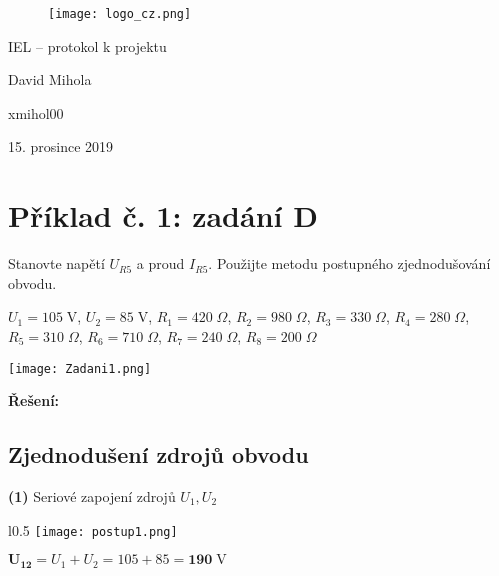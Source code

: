 \documentclass[a4paper,12pt]{article}
\begin{document}
\begin{figure}

\vspace{5em}
\begin{center}
\texttt{[image: logo\_cz.png]}
\end{center}
\end{figure}
\begin{center}
{\LARGE IEL -- protokol k projektu}\par
\vspace{1em}
{\large David Mihola\par xmihol00\par
\vspace{1em}
15. prosince 2019}
\end{center}

\newpage
\tableofcontents
\newpage
\section{Příklad č. 1: zadání D}
Stanovte napětí $U_{R5}$ a proud $I_{R5}$. Použijte metodu postupného zjednodušování obvodu.\par\vspace{1.5em}
$U_1=105\;\si{\volt}$, $U_2=85\;\si{\volt}$, $R_1=420\;\si{\Omega}$, $R_2=980\;\si{\Omega}$, $R_3=330\;\si{\Omega}$, $R_4=280\;\si{\Omega}$, $R_5=310\;\si{\Omega}$, $R_6=710\;\si{\Omega}$, $R_7=240\;\si{\Omega}$, $R_8=200\;\si{\Omega}$\vspace{1em}
\begin{center}
\texttt{[image: Zadani1.png]}
\end{center}
\newpage
\textbf{\large Řešení:}
\vspace{-1.2em}
\subsection{Zjednodušení zdrojů obvodu}\par
\hspace{1em}\textbf{(1)} Seriové zapojení zdrojů $U_1, U_2$\par
\begin{wrapfigure}{l}{0.5\textwidth}
\vspace{-83pt}
\texttt{[image: postup1.png]}
\vspace{-115pt}
\end{wrapfigure}
\vspace{70pt}\hspace{1em}$\mathbf{U_{12}}=U_1+U_2=105+85=\mathbf{190}\;\si{\volt}$\par\vspace{7,8em}
\end{document}
